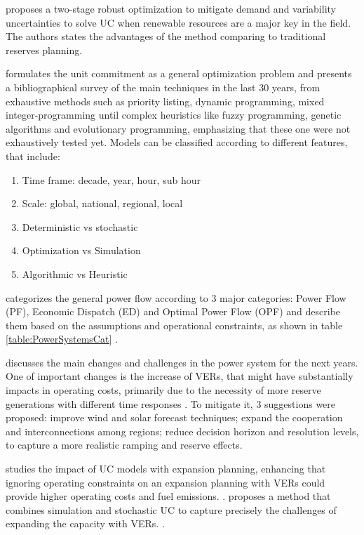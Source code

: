 \documentclass[12pt,LUDisStyle,twosided]{book}
\begin{document}
\citeauthor{bertsimas} proposes a two-stage robust optimization to mitigate demand and variability uncertainties to solve UC when renewable resources are a major key in the field. The authors states the advantages of the method comparing to traditional reserves planning. \cite{bertsimas}

\citeauthor{padhy} formulates the unit commitment as a general optimization problem and presents a bibliographical survey of the main techniques in the last 30 years, from exhaustive methods such as priority listing, dynamic programming, mixed integer-programming  until complex heuristics like fuzzy programming, genetic algorithms and evolutionary programming, emphasizing that these one were not exhaustively tested yet. Models can be classified according to different features, that include:

\begin{enumerate}
\item Time frame: decade, year, hour, sub hour 
\item Scale: global, national, regional, local
\item Deterministic vs stochastic
\item Optimization vs Simulation
\item Algorithmic vs Heuristic
\end{enumerate}

\citeauthor{cain} categorizes the general power flow according to 3 major categories: Power Flow (PF), Economic Dispatch (ED) and Optimal Power Flow (OPF) and describe them based on the assumptions and operational constraints, as shown in table \ref{table:PowerSystemsCat} \cite{cain}.

\citeauthor{kassakian} discusses the main changes and challenges in the power system for the next years. One of important changes is the increase of VERs, that might have substantially impacts in operating costs, primarily due to the necessity of more reserve generations with different time responses \cite{kassakian}. To mitigate it, 3 suggestions were proposed: improve wind and solar forecast techniques; expand the cooperation and interconnections among regions; reduce decision horizon and resolution levels, to capture a more realistic ramping and reserve effects.

\citeauthor{palmintier} studies the impact of UC models with expansion planning, enhancing that ignoring operating constraints on an expansion planning with VERs could provide higher operating costs and fuel emissions. \cite{palmintier}. \citeauthor{hargreaves} proposes a method that combines simulation and stochastic UC to capture precisely the challenges of expanding the capacity with VERs. \cite{hargreaves}.
\end{document}
